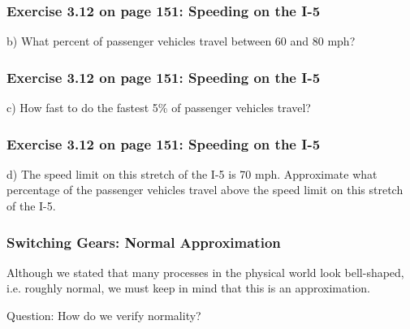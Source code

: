 \documentclass[handout]{beamer}
\newcommand{\blue}[1]{\textcolor{blue2}{#1}}
\begin{document}
\begin{frame}
\frametitle{Exercise 3.12 on page 151: Speeding on the I-5}
b) What percent of passenger vehicles travel between 60 and 80 mph?

\vspace{7cm}

\end{frame}


\begin{frame}
\frametitle{Exercise 3.12 on page 151: Speeding on the I-5}
c) How fast to do the fastest 5\% of passenger vehicles travel?

\vspace{7cm}

\end{frame}


\begin{frame}
\frametitle{Exercise 3.12 on page 151: Speeding on the I-5}
d) The speed limit on this stretch of the I-5 is 70 mph. Approximate what percentage of
the passenger vehicles travel above the speed limit on this stretch of the I-5.

\vspace{7cm}

\end{frame}


\begin{frame}
\frametitle{Switching Gears: Normal Approximation}

Although we stated that many processes in the physical world look bell-shaped, i.e. roughly normal, we must keep in mind that this is an \blue{approximation}.  

\vspace{0.5cm}

\pause\blue{Question}: How do we verify normality?

\end{frame}
\end{document}
